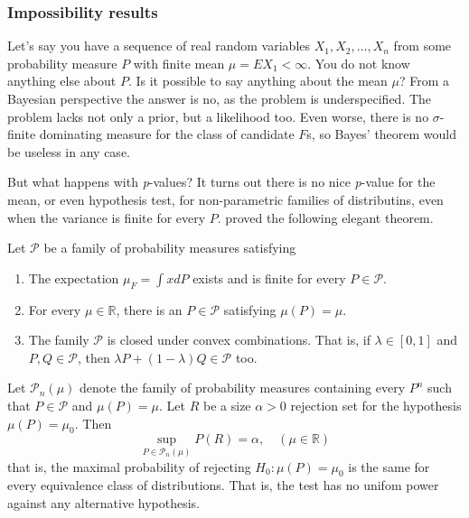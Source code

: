 \subsubsection{Impossibility results}

Let's say you have a sequence of real random variables $X_{1},X_{2},\ldots,X_{n}$
from some probability measure $P$ with finite mean $\mu=EX_{1}<\infty$.
You do not know anything else about $P$. Is it possible to say anything
about the mean $\mu$? From a Bayesian perspective the answer is no,
as the problem is underspecified. The problem lacks not only a prior,
but a likelihood too. Even worse, there is no $\sigma$-finite dominating
measure for the class of candidate $F$s, so Bayes' theorem would
be useless in any case. 

But what happens with \emph{p}-values? It turns out there is no nice
\emph{p}-value for the mean, or even hypothesis test, for non-parametric
families of distributins, even when the variance is finite for every
$P$. \textcite{Bahadur1956-tg} proved the following elegant theorem.
\begin{theorem}
Let $\mathcal{\mathcal{P}}$ be a family of probability measures
satisfying
\begin{enumerate}
\item The expectation $\mu_{F}=\int xdP$ exists and is finite for every
$P\in\mathcal{P}$.
\item For every $\mu\in\mathbb{R}$, there is an $P\in\mathcal{\mathcal{P}}$
satisfying $\mu(P)=\mu$.
\item The family $\mathcal{\mathcal{P}}$ is closed under convex combinations.
That is, if $\lambda\in[0,1]$ and $P,Q\in\mathcal{P}$, then $\lambda P+(1-\lambda)Q\in\mathcal{P}$
too.
\end{enumerate}
Let $\mathcal{P}_{n}(\mu)$ denote the family of probability measures
containing every $P^{n}$ such that $P\in\mathcal{P}$ and $\mu(P)=\mu$.
Let $R$ be a size $\alpha>0$ rejection set for the hypothesis $\mu(P)=\mu_{0}$.
Then 
\[
\sup_{P\in\mathcal{P}_{n}(\mu)}P(R)=\alpha,\quad(\mu\in\mathbb{R})
\]
that is, the maximal probability of rejecting $H_{0}:\mu(P)=\mu_{0}$
is the same for every equivalence class of distributions. That is,
the test has no unifom power against any alternative hypothesis. 
\end{theorem}

